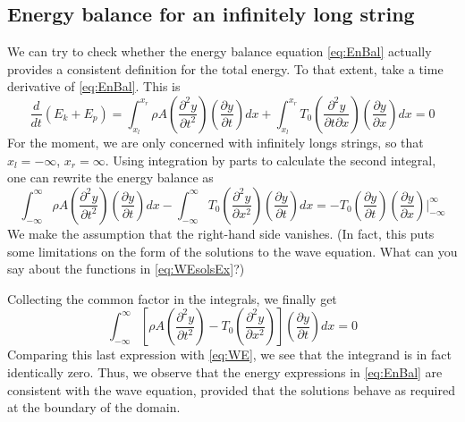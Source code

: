 \documentclass[11pt,twoside,a4paper,english]{book}
\begin{document}
\subsection{Energy balance for an infinitely long string}



We can try to check whether the energy balance equation \eqref{eq:EnBal} actually provides a consistent definition for the total energy. To that extent, take a time derivative of \eqref{eq:EnBal}. This is
\begin{equation}
\frac{d}{dt}\left( E_k + E_p \right) = \int_{x_l}^{x_r} \rho A \left(\frac{\partial^2 y}{\partial t^2}\right)\left(\frac{\partial y}{\partial t}\right) dx + \int_{x_l}^{x_r} T_0 \left(\frac{\partial^2 y}{\partial t\partial x}\right)\left(\frac{\partial y}{\partial x}\right) dx = 0
\end{equation}
For the moment, we are only concerned with infinitely longs strings, so that $x_l = -\infty$, $x_r = \infty$. Using integration by parts to calculate the second integral, one can rewrite the energy balance as
\begin{equation}
\int_{-\infty}^{\infty} \rho A \left(\frac{\partial^2 y}{\partial t^2}\right)\left(\frac{\partial y}{\partial t}\right) dx - \int_{-\infty}^{\infty} T_0 \left(\frac{\partial^2 y}{\partial x^2}\right)\left(\frac{\partial y}{\partial t}\right) dx = - T_0 \left(\frac{\partial y}{\partial t}\right)\left(\frac{\partial y}{\partial x}\right)\bigg|_{-\infty}^{\infty}
\end{equation}
We make the assumption that the right-hand side vanishes. (In fact, this puts some limitations on the form of the solutions to the wave equation. What can you say about the functions in \eqref{eq:WEsolsEx}?)


Collecting the common factor in the integrals, we finally get
\begin{equation}
\int_{-\infty}^{\infty} \left[ \rho A \left(\frac{\partial^2 y}{\partial t^2}\right) - T_0 \left(\frac{\partial^2 y}{\partial x^2}\right) \right]\left(\frac{\partial y}{\partial t}\right) dx  = 0
\end{equation}
Comparing this last expression with \eqref{eq:WE}, we see that the integrand is in fact identically zero. Thus, we observe that the energy expressions in \eqref{eq:EnBal} are consistent with the wave equation, provided that the solutions behave as required at the boundary of the domain.
\end{document}
